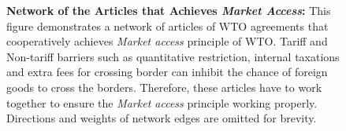 

\begin{figure}
    \centering{
      
    }
    \caption{{\bf Network of the Articles that Achieves \textit{Market Access}:} 
    This figure demonstrates a network of articles of WTO agreements
    that cooperatively achieves \textit{Market access} principle of WTO. 
    Tariff and Non-tariff barriers such as quantitative restriction, internal taxations 
    and extra fees for crossing border can inhibit the chance of foreign goods to cross the borders.
    Therefore, these articles have to work together to ensure the \textit{Market access} principle working properly.
    Directions and weights of network edges are omitted for brevity. 
    }
    \label{fig:market-aceess_directed}
  \end{figure}
  
% 

% 



